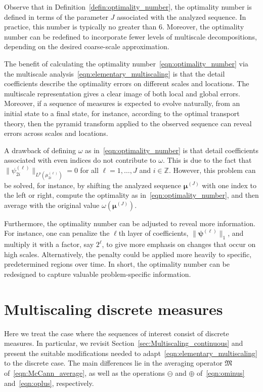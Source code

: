 \documentclass[12pt]{amsart}
\begin{document}
Observe that in Definition~\ref{defin:optimality_number}, the optimality number is defined in terms of the parameter $J$ associated with the analyzed sequence. In practice, this number is typically no greater than $6$. Moreover, the optimality number can be redefined to incorporate fewer levels of multiscale decompositions, depending on the desired coarse-scale approximation.

The benefit of calculating the optimality number~\eqref{eqn:optimality_number} via the multiscale analysis~\eqref{eqn:elementary_multiscaling} is that the detail coefficients describe the optimality errors on different scales and locations. The multiscale representation gives a clear image of both local and global errors. Moreover, if a sequence of measures is expected to evolve naturally, from an initial state to a final state, for instance, according to the optimal transport theory, then the pyramid transform applied to the observed sequence can reveal errors across scales and locations.

A drawback of defining $\omega$ as in~\eqref{eqn:optimality_number} is that detail coefficients associated with even indices do not contribute to $\omega$. This is due to the fact that $\|\psi^{(\ell)}_{2i}\|_{L^p(\mu^{(\ell)}_{2i})}=0$ for all $\ell=1,\dots,J$ and $i\in\mathbb{Z}$. However, this problem can be solved, for instance, by shifting the analyzed sequence $\boldsymbol{\mu}^{(J)}$ with one index to the left or right, compute the optimality as in~\eqref{eqn:optimality_number}, and then average with the original value $\omega(\boldsymbol{\mu}^{(J)})$.

Furthermore, the optimality number can be adjusted to reveal more information. For instance, one can penalize the $\ell$th layer of coefficients, $\|\boldsymbol{\psi}^{(\ell)}\|_1$, and multiply it with a factor, say $2^\ell$, to give more emphasis on changes that occur on high scales. Alternatively, the penalty could be applied more heavily to specific, predetermined regions over time. In short, the optimality number can be redesigned to capture valuable problem-specific information.

\section{Multiscaling discrete measures}\label{sec:multiscaling_discrete}

Here we treat the case where the sequences of interest consist of discrete measures. In particular, we revisit Section~\ref{sec:Multiscaling_continuous} and present the suitable modifications needed to adapt~\eqref{eqn:elementary_multiscaling} to the discrete case. The main differences lie in the averaging operator $\mathfrak{M}$ of~\eqref{eqn:McCann_average}, as well as the operations $\ominus$ and $\oplus$ of~\eqref{eqn:ominus} and~\eqref{eqn:oplus}, respectively.
\end{document}

